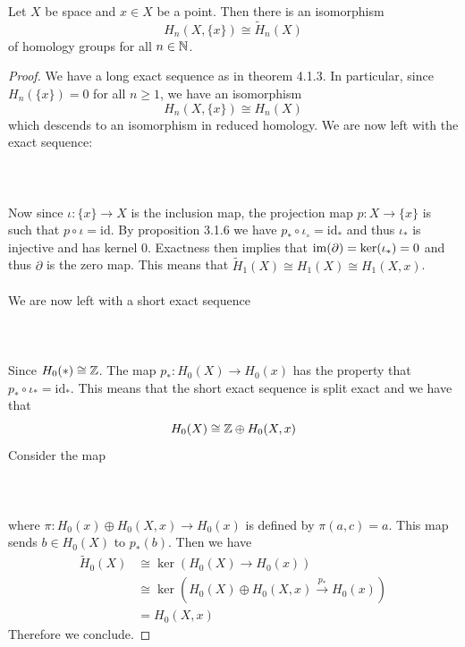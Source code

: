 \documentclass[a4paper]{article}
\begin{document}
\begin{lmm}{}{} Let $X$ be space and $x\in X$ be a point. Then there is an isomorphism $$H_n(X,\{x\})\cong\widetilde{H}_n(X)$$ of homology groups for all $n\in\mathbb{N}$. \tcbline
\begin{proof}
We have a long exact sequence as in theorem 4.1.3. In particular, since $H_n(\{x\})=0$ for all $n\geq 1$, we have an isomorphism $$H_n(X,\{x\})\cong H_n(X)$$ which descends to an isomorphism in reduced homology. We are now left with the exact sequence: \\~\\
\\~\\
Now since $\iota:\{x\}\to X$ is the inclusion map, the projection map $p:X\to\{x\}$ is such that $p\circ\iota=\text{id}$. By proposition 3.1.6 we have $p_\ast\circ\iota_\circ=\text{id}_\ast$ and thus $\iota_\ast$ is injective and has kernel $0$. Exactness then implies that $\operatorname{im}(\partial)=\ker(\iota_\ast)=0$ and thus $\partial$ is the zero map. This means that $\tilde{H}_1(X)\cong H_1(X)\cong H_1(X,x)$. \\~\\

We are now left with a short exact sequence\\~\\
\\~\\
Since $H_0(\ast)\cong\mathbb{Z}$. The map $p_\ast:H_0(X)\to H_0(x)$ has the property that $p_\ast\circ\iota_\ast=\text{id}_\ast$. This means that the short exact sequence is split exact and we have that $$H_0(X)\cong\mathbb{Z}\oplus H_0(X,x)$$ Consider the map \\~\\
\\~\\
where $\pi:H_0(x)\oplus H_0(X,x)\to H_0(x)$ is defined by $\pi(a,c)=a$. This map sends $b\in H_0(X)$ to $p_\ast(b)$. Then we have 
\begin{align*}
\widetilde{H}_0(X)&\cong\ker(H_0(X)\to H_0(x))\\
&\cong\ker(H_0(X)\oplus H_0(X,x)\overset{p_\ast}{\to}H_0(x))\\
&=H_0(X,x)
\end{align*}
Therefore we conclude. 
\end{proof}
\end{lmm}
\end{document}
